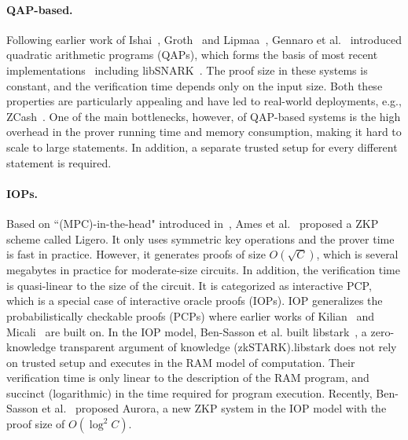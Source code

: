 \paragraph{QAP-based.} Following earlier work of Ishai~\cite{IshaiKO07}, Groth~\cite{groth2010short} and Lipmaa~\cite{lipmaa2012progression}, Gennaro et al.~\cite{GGPR13} introduced quadratic arithmetic programs (QAPs), which forms the basis of most recent implementations~\cite{parno2013pinocchio,ben2013snarks,braun13,ben2014scalable,geppetto,wahby2015efficient,Fiore16} including \textsf{libSNARK}~\cite{libsnark}. The proof size in these systems is constant, and the verification time depends only on the input size. Both these properties are particularly appealing and have led to real-world deployments, e.g., ZCash~\cite{zerocash}. One of the main bottlenecks, however, of QAP-based systems  is the high overhead in the prover running time and memory consumption, making it hard to scale to large statements. In addition, a separate trusted setup for every different statement is required. 


\paragraph{IOPs.} Based on ``(MPC)-in-the-head" introduced in~\cite{ishai2007zero,giacomelli2016zkboo,chase2017post}, Ames et al.~\cite{ligero} proposed a ZKP scheme called \textsf{Ligero}. It only uses symmetric key operations and the prover time is fast in practice. However, it generates proofs of size $O(\sqrt{C})$, which is several megabytes in practice for moderate-size circuits. In addition, the verification time is quasi-linear to the size of the circuit. It is categorized as interactive PCP, which is a special case of interactive oracle proofs (IOPs). IOP generalizes the probabilistically checkable proofs (PCPs) where earlier works of Kilian~\cite{Kilian92} and Micali~\cite{Micali00} are built on. In the IOP model, Ben-Sasson et al. built \textsf{libstark}~\cite{libstark}, a zero-knowledge transparent argument of knowledge (zkSTARK).\textsf{libstark} does not rely on trusted setup and executes in the RAM model of computation. Their verification time is only linear to the description of the RAM program, and succinct (logarithmic) in the time required for program execution. Recently, Ben-Sasson et al.~\cite{aurora} proposed \textsf{Aurora}, a new ZKP system in the IOP model with the proof size of $O(\log^2 C)$.   

